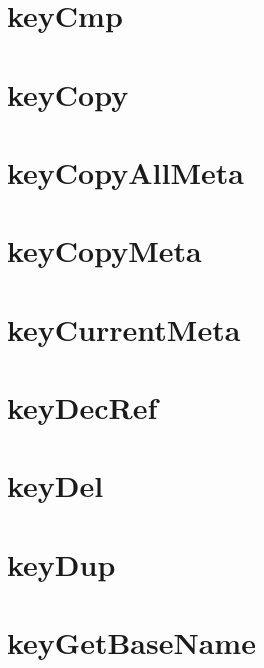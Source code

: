 \documentclass[twoside]{book}
\newcommand{\+}{\discretionary{\mbox{\scriptsize$\hookleftarrow$}}{}{}}
\begin{document}
\chapter{key\+Cmp}
\label{doc_api_review_core_keyCmp_md}

\chapter{key\+Copy}
\label{doc_api_review_core_keyCopy_md}

\chapter{key\+Copy\+All\+Meta}
\label{doc_api_review_core_keyCopyAllMeta_md}

\chapter{key\+Copy\+Meta}
\label{doc_api_review_core_keyCopyMeta_md}

\chapter{key\+Current\+Meta}
\label{doc_api_review_core_keyCurrentMeta_md}

\chapter{key\+Dec\+Ref}
\label{doc_api_review_core_keyDecRef_md}

\chapter{key\+Del}
\label{doc_api_review_core_keyDel_md}

\chapter{key\+Dup}
\label{doc_api_review_core_keyDup_md}

\chapter{key\+Get\+Base\+Name}
\label{doc_api_review_core_keyGetBaseName_md}

\end{document}
